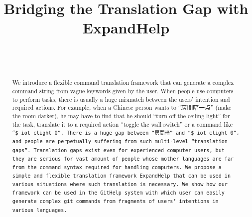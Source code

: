 \documentclass{sigchi}
\def\plaintitle{Bridging the Translation Gap with ExpandHelp}
\def\GH{\textsf{GitHelp}}
\def\EH{\textsf{ExpandHelp}}
\def\GIT{\texttt{git}}
\begin{document}
\title{\plaintitle}

\author{%
  \\
  \\
}

\maketitle

\begin{abstract}
  We introduce a flexible command translation framework that can generate
  a complex command string from vague keywords
  given by the user.
  When people use computers to perform tasks,
  there is usually a huge mismatch between the users' intention
  and required actions.
  For example, when a Chinese person wants to ``房間暗一点'' (make the room darker),
  he may have to find that he should ``turn off the ceiling light'' for the task,
  translate it to a required action ``toggle the wall switch''
  or a command like ``\tt{\$ iot clight 0}''.
  There is a huge gap between ``房間暗'' and ``\tt{\$ iot clight 0}'', and
  people are perpetually suffering from such multi-level ``\textit{translation gaps}''.
  Translation gaps exist even for experienced computer users, but
  they are serious for vast amount of people
  whose mother languages are far from the command syntax required for
  handling computers.
  We propose a simple and flexible translation framework
  {\EH} that can be used in various situations
  where such translation is necessary.
  We show how our framework can be used
  in the {\GH} system
  with which user can easily generate complex {\GIT} commands
  from fragments of users' intentions in various languages.
\end{abstract}
\end{document}
